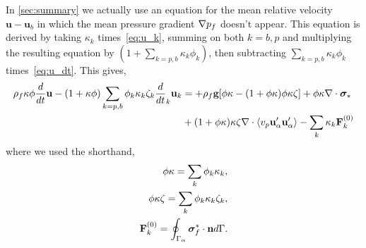 In \ref{sec:summary} we actually use an equation for the mean relative velocity $\textbf{u}-\textbf{u}_b$ in which the mean pressure gradient $\mathbf{\nabla} p_f$ doesn't appear. 
This equation is derived by taking $\kappa_k$ times~\ref{eq:u_k}, summing on both $k=b,p$ and multiplying the resulting equation by $(1+\sum_{k=p,b}\kappa_k\phi_k)$, then subtracting $\sum_{k=p,b}\kappa_k\phi_k$ times~\ref{eq:u_dt}. 
This gives, 
\begin{align}
    \rho_f \kappa \phi \ddt \textbf{u}
    - (1+\kappa\phi) \sum_{k=p,b}\phi_k\kappa_k\zeta_k \ddt_k \textbf{u}_k
    &=
    +\rho_f \textbf{g}[\phi \kappa - (1+\phi\kappa)\phi \kappa\zeta]
    +\phi\kappa\div \bm\sigma_*\nonumber \\
    &+(1+\phi\kappa)\kappa\zeta\div \avg{v_p \textbf{u}_\alpha' \textbf{u}_\alpha'}
    - \sum_k \kappa_k  \textbf{F}_{k}^{(0)}
    \label{eq:Du}
\end{align}
where we used the shorthand,
\begin{align*}
    \phi \kappa =\sum_k \phi_k \kappa_k,\\
    \phi \kappa \zeta =\sum_k \phi_k \kappa_k \zeta_k, \\
    \textbf{F}_{k}^{(0)} = \oint_{\Gamma_{\alpha}} \bm{\sigma}_f^* \cdot \textbf{n} d\Gamma.
\end{align*}

